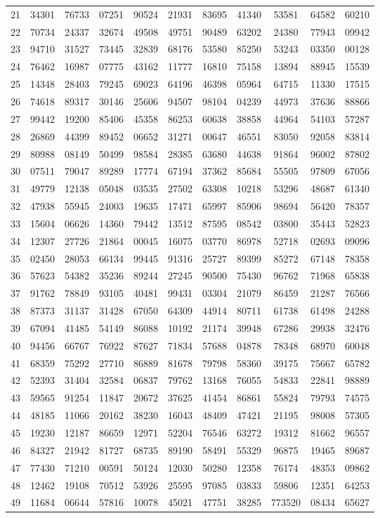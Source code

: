 \begin{table}
\begin{otherlanguage}{english}
\begin{tabular}{|C|CCCCCCCCCC|}
21&34301&76733&07251&90524&21931&83695&41340&53581&64582&60210\\
22&70734&24337&32674&49508&49751&90489&63202&24380&77943&09942\\
23&94710&31527&73445&32839&68176&53580&85250&53243&03350&00128\\
24&76462&16987&07775&43162&11777&16810&75158&13894&88945&15539\\[1ex]
25&14348&28403&79245&69023&64196&46398&05964&64715&11330&17515\\
26&74618&89317&30146&25606&94507&98104&04239&44973&37636&88866\\
27&99442&19200&85406&45358&86253&60638&38858&44964&54103&57287\\
28&26869&44399&89452&06652&31271&00647&46551&83050&92058&83814\\
29&80988&08149&50499&98584&28385&63680&44638&91864&96002&87802\\[1ex]
30&07511&79047&89289&17774&67194&37362&85684&55505&97809&67056\\
31&49779&12138&05048&03535&27502&63308&10218&53296&48687&61340\\
32&47938&55945&24003&19635&17471&65997&85906&98694&56420&78357\\
33&15604&06626&14360&79442&13512&87595&08542&03800&35443&52823\\
34&12307&27726&21864&00045&16075&03770&86978&52718&02693&09096\\[1ex]
35&02450&28053&66134&99445&91316&25727&89399&85272&67148&78358\\
36&57623&54382&35236&89244&27245&90500&75430&96762&71968&65838\\
37&91762&78849&93105&40481&99431&03304&21079&86459&21287&76566\\
38&87373&31137&31428&67050&64309&44914&80711&61738&61498&24288\\
39&67094&41485&54149&86088&10192&21174&39948&67286&29938&32476\\[1ex]
40&94456&66767&76922&87627&71834&57688&04878&78348&68970&60048\\
41&68359&75292&27710&86889&81678&79798&58360&39175&75667&65782\\
42&52393&31404&32584&06837&79762&13168&76055&54833&22841&98889\\
43&59565&91254&11847&20672&37625&41454&86861&55824&79793&74575\\
44&48185&11066&20162&38230&16043&48409&47421&21195&98008&57305\\[1ex]
45&19230&12187&86659&12971&52204&76546&63272&19312&81662&96557\\
46&84327&21942&81727&68735&89190&58491&55329&96875&19465&89687\\
47&77430&71210&00591&50124&12030&50280&12358&76174&48353&09862\\
48&12462&19108&70512&53926&25595&97085&03833&59806&12351&64253\\
49&11684&06644&57816&10078&45021&47751&38285&773520&08434&65627\\
\hline
\end{tabular}
\end{otherlanguage}
\end{table}
